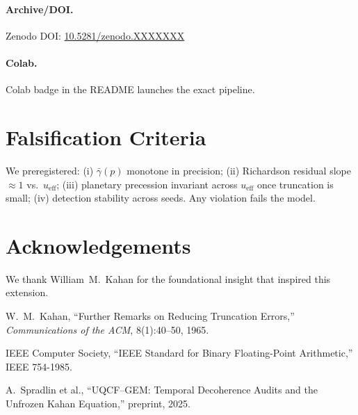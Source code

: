 \documentclass[11pt]{article}
\newcommand{\ueff}{u_{\mathrm{eff}}}
\begin{document}
\paragraph{Archive/DOI.} Zenodo DOI: \href{https://doi.org/10.5281/zenodo.XXXXXXX}{10.5281/zenodo.XXXXXXX}

\paragraph{Colab.} Colab badge in the README launches the exact pipeline.

\section{Falsification Criteria}
We preregistered: (i) \(\bar\gamma(p)\) monotone in precision; (ii) Richardson residual slope \(\approx 1\) vs.\ \(\ueff\); (iii) planetary precession invariant across \(\ueff\) once truncation is small; (iv) detection stability across seeds. Any violation fails the model.

\section*{Acknowledgements}
We thank William~M.~Kahan for the foundational insight that inspired this extension.

\begin{thebibliography}{9}
W.~M.~Kahan, ``Further Remarks on Reducing Truncation Errors,'' \emph{Communications of the ACM}, 8(1):40–50, 1965.

IEEE Computer Society, ``IEEE Standard for Binary Floating-Point Arithmetic,'' IEEE 754-1985.

A.~Spradlin et al., ``UQCF–GEM: Temporal Decoherence Audits and the Unfrozen Kahan Equation,'' preprint, 2025.
\end{thebibliography}
\end{document}
